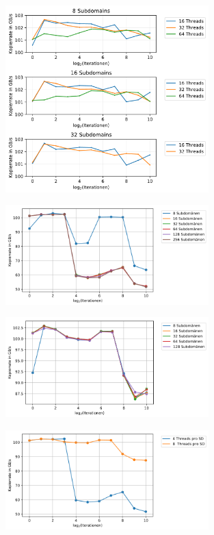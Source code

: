 \documentclass[11pt, abstract=on]{scrartcl}
\begin{document}
\begin{figure} [htbp]
 	\centering
 		\includegraphics[width=0.7\textwidth]{Graph_OffsetAccessSDpBlock.png}
 	\caption{}
\end{figure}

\begin{figure} [htbp]
 	\centering
 		\includegraphics[width=0.7\textwidth]{Graph_OffsetAccessSDpBlock2.png}
 	\caption{}
\end{figure}

\begin{figure} [htbp]
 	\centering
 		\includegraphics[width=0.7\textwidth]{Graph_OffsetAccessSDpBlock3.png}
 	\caption{}
\end{figure}

\begin{figure} [htbp]
 	\centering
 		\includegraphics[width=0.7\textwidth]{Graph_OffsetAccessSDpBlock4.png}
 	\caption{}
\end{figure}
\end{document}
